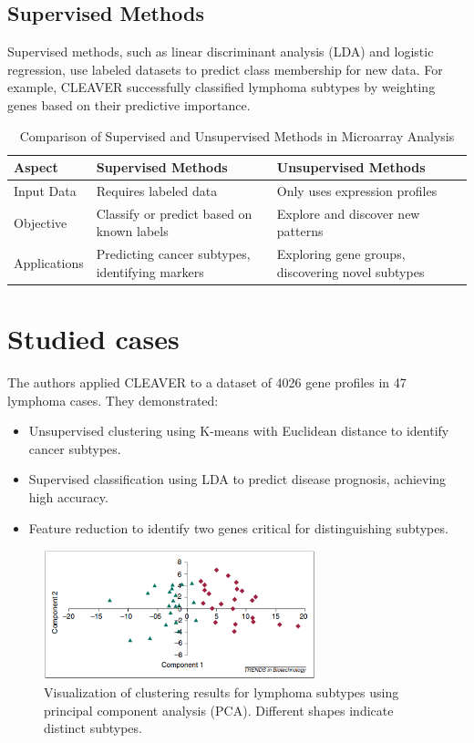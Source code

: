 \documentclass{llncs}
\begin{document}
\subsection{Supervised Methods}
Supervised methods, such as linear discriminant analysis (LDA) and logistic regression, use labeled datasets to predict class membership for new data. For example, CLEAVER successfully classified lymphoma subtypes by weighting genes based on their predictive importance.

\begin{table}[ht]
    \caption{Comparison of Supervised and Unsupervised Methods in Microarray Analysis}
    \label{tab:methods}
    \centering
    \begin{tabular}{@{}p{4cm}|p{5cm}|p{5cm}@{}}
        \toprule
        \textbf{Aspect} & \textbf{Supervised Methods} & \textbf{Unsupervised Methods} \\
        \midrule
        Input Data & Requires labeled data & Only uses expression profiles \\
        Objective & Classify or predict based on known labels & Explore and discover new patterns \\
        Applications & Predicting cancer subtypes, identifying markers & Exploring gene groups, discovering novel subtypes \\
        \bottomrule
    \end{tabular}
\end{table}

\section{Studied cases}
The authors applied CLEAVER to a dataset of 4026 gene profiles in 47 lymphoma cases. They demonstrated:
\begin{itemize}
    \item Unsupervised clustering using K-means with Euclidean distance to identify cancer subtypes.
    \item Supervised classification using LDA to predict disease prognosis, achieving high accuracy.
    \item Feature reduction to identify two genes critical for distinguishing subtypes.
\end{itemize}

\begin{figure}[ht]
    \centering
    \includegraphics[width=0.7\textwidth]{image.png}
    \caption{Visualization of clustering results for lymphoma subtypes using principal component analysis (PCA). Different shapes indicate distinct subtypes.}
    \label{fig:clustering}
\end{figure}
\end{document}
